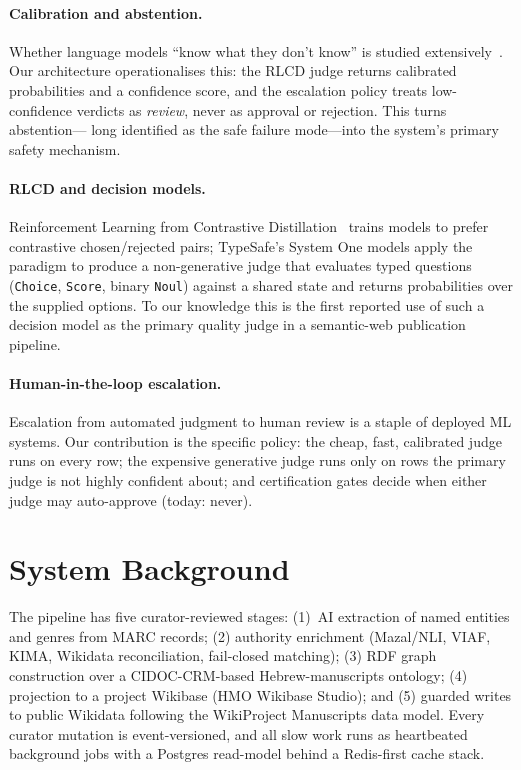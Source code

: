 \documentclass{llncs}
\begin{document}
\paragraph{Calibration and abstention.}
Whether language models ``know what they don't know'' is studied
extensively~\cite{kadavath2022language}. Our architecture operationalises
this: the RLCD judge returns calibrated probabilities and a confidence
score, and the escalation policy treats low-confidence verdicts as
\emph{review}, never as approval or rejection. This turns abstention---%
long identified as the safe failure mode---into the system's primary
safety mechanism.

\paragraph{RLCD and decision models.}
Reinforcement Learning from Contrastive
Distillation~\cite{yang2023rlcd} trains models to prefer contrastive
chosen/rejected pairs; TypeSafe's System One models apply the paradigm to
produce a non-generative judge that evaluates typed questions
(\texttt{Choice}, \texttt{Score}, binary \texttt{Noul}) against a shared
state and returns probabilities over the supplied options. To our
knowledge this is the first reported use of such a decision model as the
primary quality judge in a semantic-web publication pipeline.

\paragraph{Human-in-the-loop escalation.}
Escalation from automated judgment to human review is a staple of
deployed ML systems. Our contribution is the specific policy: the cheap,
fast, calibrated judge runs on every row; the expensive generative judge
runs only on rows the primary judge is not highly confident about; and
certification gates decide when either judge may auto-approve (today:
never).

\section{System Background}
\label{sec:system}

The pipeline has five curator-reviewed stages: (1)~AI extraction of named
entities and genres from MARC records; (2) authority enrichment (Mazal/NLI,
VIAF, KIMA, Wikidata reconciliation, fail-closed matching); (3) RDF graph
construction over a CIDOC-CRM-based Hebrew-manuscripts ontology; (4)
projection to a project Wikibase (HMO Wikibase Studio); and (5) guarded
writes to public Wikidata following the WikiProject Manuscripts data
model. Every curator mutation is event-versioned, and all slow work runs
as heartbeated background jobs with a Postgres read-model behind a
Redis-first cache stack.
\end{document}
